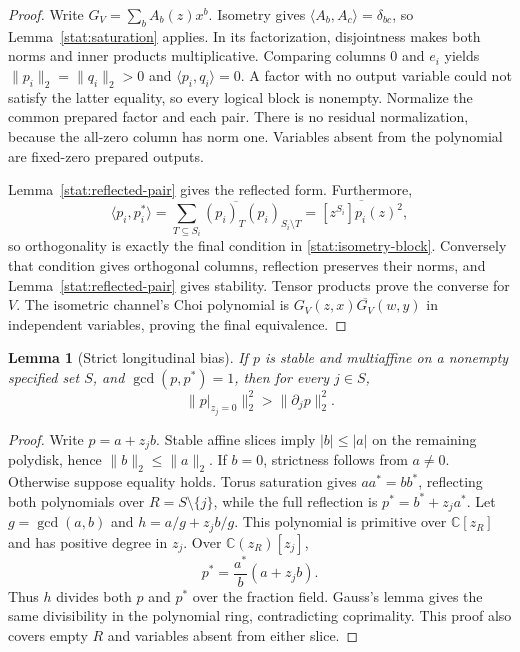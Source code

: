 \documentclass[reqno]{amsart}
\newtheorem{lemma}[theorem]{Lemma}
\theoremstyle{definition}
\theoremstyle{remark}
\newcommand{\C}{\mathbb C}
\begin{document}
\begin{proof}
Write \(G_V=\sum_bA_b(z)x^b\).  Isometry gives
\(\langle A_b,A_c\rangle=\delta_{bc}\), so
Lemma~\ref{stat:saturation} applies.  In its factorization,
disjointness makes both norms and inner products multiplicative.
Comparing columns \(0\) and \(e_i\) yields
\(\|p_i\|_2=\|q_i\|_2>0\) and
\(\langle p_i,q_i\rangle=0\).  A factor with no output variable
could not satisfy the latter equality, so every logical block is
nonempty.  Normalize the common prepared factor and each pair.
There is no residual normalization, because the all-zero column
has norm one.  Variables absent from the polynomial are fixed-zero
prepared outputs.

Lemma~\ref{stat:reflected-pair} gives the reflected form.
Furthermore,
\[
 \langle p_i,p_i^*\rangle
 =\overline{\sum_{T\subseteq S_i}(p_i)_T(p_i)_{S_i\setminus T}}
 =\overline{[z^{S_i}]p_i(z)^2},
\]
so orthogonality is exactly the final condition in
\eqref{stat:isometry-block}.  Conversely that condition gives
orthogonal columns, reflection preserves their norms, and
Lemma~\ref{stat:reflected-pair} gives stability.  Tensor products
prove the converse for \(V\).  The isometric channel's Choi
polynomial is \(G_V(z,x)\overline{G_V}(w,y)\) in independent
variables, proving the final equivalence.
\end{proof}

\begin{lemma}[Strict longitudinal bias]
\label{stat:strict-bias}
If \(p\) is stable and multiaffine on a nonempty specified set
\(S\), and \(\gcd(p,p^*)=1\), then for every \(j\in S\),
\begin{equation}
 \|p|_{z_j=0}\|_2^2>\|\partial_jp\|_2^2.
 \label{stat:strict-slice}
\end{equation}
\end{lemma}

\begin{proof}
Write \(p=a+z_jb\).  Stable affine slices imply \(|b|\le|a|\)
on the remaining polydisk, hence \(\|b\|_2\le\|a\|_2\).
If \(b=0\), strictness follows from \(a\ne0\).
Otherwise suppose equality holds.  Torus saturation gives
\(aa^*=bb^*\), reflecting both polynomials over
\(R=S\setminus\{j\}\), while the full reflection is
\(p^*=b^*+z_ja^*\).
Let \(g=\gcd(a,b)\) and
\(h=a/g+z_jb/g\).  This polynomial is primitive over \(\C[z_R]\)
and has positive degree in \(z_j\).  Over \(\C(z_R)[z_j]\),
\[
 p^*=\frac{a^*}{b}(a+z_jb).
\]
Thus \(h\) divides both \(p\) and \(p^*\) over the fraction
field.  Gauss's lemma gives the same divisibility in the polynomial
ring, contradicting coprimality.  This proof also covers empty
\(R\) and variables absent from either slice.
\end{proof}
\end{document}
